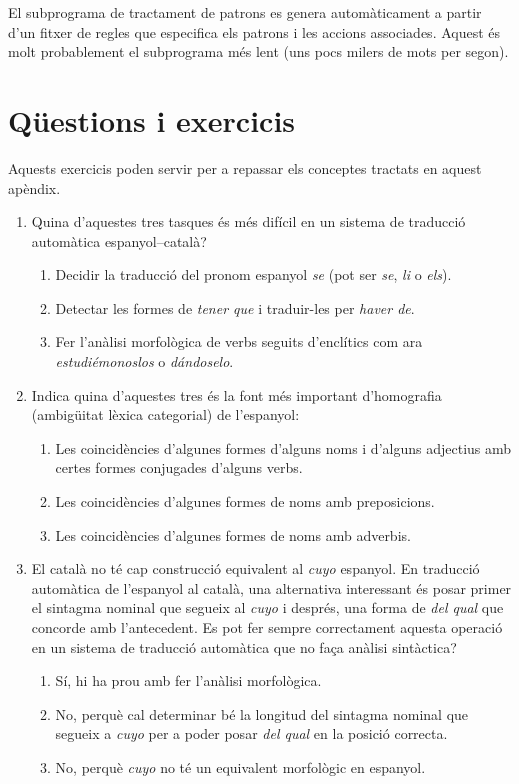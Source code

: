  El subprograma de tractament de patrons es genera automàticament a
 partir d'un fitxer de regles que especifica els patrons i les accions
 associades. Aquest és molt probablement el subprograma més lent
 (uns pocs milers de mots per segon).


\section{Qüestions i exercicis}
Aquests exercicis poden servir per a repassar els conceptes tractats en aquest apèndix.
\begin{enumerate}
\item Quina d'aquestes tres tasques és més difícil en un sistema de
  traducció automàtica espanyol--català?
\begin{enumerate}
\item Decidir la traducció del pronom espanyol \emph{se} (pot ser \emph{se},
\emph{li} o \emph{els}).
\item Detectar les formes de \emph{tener que} i traduir-les per \emph{haver de}.
\item Fer l'anàlisi morfològica de verbs seguits d'enclítics 
com ara \emph{estudiémonoslos} o \emph{dándoselo}.
\end{enumerate}

\item Indica quina d'aquestes tres 
és la font més important d'homografia (ambigüitat lèxica
categorial) de l'espanyol:
\begin{enumerate}
\item Les coincidències d'algunes formes d'alguns  
noms i d'alguns adjectius amb certes formes conjugades d'alguns verbs.
\item Les coincidències d'algunes formes de noms amb preposicions.
\item Les coincidències d'algunes formes de noms amb adverbis.
\end{enumerate}

\item El català no té cap construcció equivalent al \emph{cuyo}
  espanyol. En traducció automàtica de l'espanyol al català, una
  alternativa interessant és posar primer el sintagma nominal que
  segueix al \emph{cuyo} i després, una forma de \emph{del
    qual} que concorde amb l'antecedent. Es pot fer sempre
  correctament aquesta operació 
  en un sistema de traducció automàtica que no faça anàlisi
  sintàctica?
\begin{enumerate}
\item Sí, hi ha prou amb fer l'anàlisi morfològica.
\item No, perquè cal determinar bé la longitud del sintagma nominal
  que segueix a \emph{cuyo} per a poder posar \emph{del qual} en la
  posició correcta.
\item No, perquè \emph{cuyo} no té un equivalent morfològic en
  espanyol.
\end{enumerate}



\end{enumerate}

